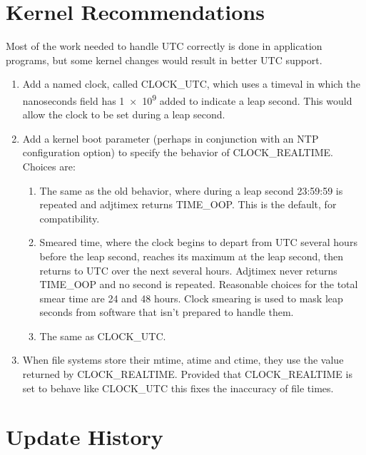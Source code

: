 \documentclass[letterpaper,twoside]{article}
\begin{document}
\section{Kernel Recommendations}
\label{section:KernelRecommendations}
Most of the work needed to handle UTC correctly is done in application
programs, but some kernel changes would result in better UTC support.
\begin{enumerate}
\item Add a named clock, called {\ttfamily CLOCK\_UTC}, which uses
  a {\ttfamily timeval} in which the nanoseconds field has
  \num[retain-unity-mantissa = false]{1e9} added to
  indicate a leap second.  This would allow the clock to be set
  during a leap second.
\item Add a kernel boot parameter (perhaps in conjunction with
  an NTP configuration option) to specify the behavior of
  {\ttfamily CLOCK\_REALTIME}.
  Choices are:
  \begin{enumerate}
  \item The same as the old behavior, where during a leap second
    23:59:59 is repeated and {\ttfamily adjtimex} returns
    {\ttfamily TIME\_OOP}.  This is the default, for compatibility.
  \item Smeared time, where the clock begins to depart from UTC several hours
    before the leap second, reaches its maximum at the leap second, then
    returns to UTC over the next several hours.  {\ttfamily Adjtimex}
    never returns {\ttfamily TIME\_OOP} and no second is repeated.
    Reasonable choices for the total smear time are 24 and 48 hours.
    Clock smearing is used to mask leap seconds from software that isn't
    prepared to handle them.
  \item The same as {\ttfamily CLOCK\_UTC}.
  \end{enumerate}
\item When file systems store their mtime, atime and ctime, they use
  the value returned by {\ttfamily CLOCK\_REALTIME}.  Provided that
  {\ttfamily CLOCK\_REALTIME} is set to behave like {\ttfamily CLOCK\_UTC}
  this fixes the inaccuracy of file times.
\end{enumerate}

\section{Update History}
\end{document}

